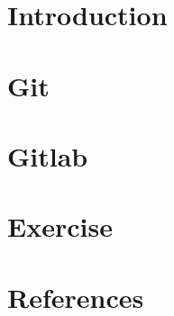 \documentclass{IEECSlides}
\begin{document}




\section{Introduction}



\section{Git}



\section{Gitlab}



\section{Exercise}



\section{References}


\end{document}
